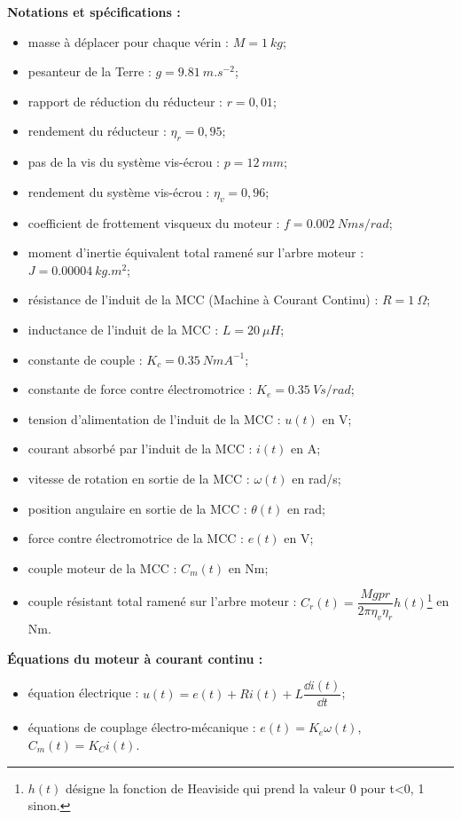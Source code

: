 \textbf{Notations et spécifications :}
\begin{multicols}{2}
\begin{itemize}
\item masse à déplacer pour chaque vérin : $M =\SI{1}{kg}$;
\item pesanteur de la Terre : $g = \SI{9,81}{m.s^{-2}}$;
\item rapport de réduction du réducteur : $r = 0,01$;
\item rendement du réducteur : $\eta_r = 0,95$;
\item pas de la vis du système vis-écrou : $p = \SI{12}{mm}$;
\item rendement du système vis-écrou : $\eta_v = 0,96$;
\item coefficient de frottement visqueux du moteur : $f=\SI{0,002}{Nms/rad}$;
\item moment d’inertie équivalent total ramené sur l’arbre moteur : $J = \SI{0,00004}{kg.m^2}$;
\item résistance de l’induit de la MCC (Machine à Courant Continu) : $R =\SI{1}{\Omega}$;
\item inductance de l’induit de la MCC : $L = \SI{20}{\mu H}$;
\item constante de couple : $K_c = \SI{0,35}{NmA^{-1}}$;
\item constante de force contre électromotrice : $K_e = \SI{0,35}{Vs/rad}$;
\item tension d’alimentation de l’induit de la MCC : $u(t)$ en \si{V};
\item courant absorbé par l’induit de la MCC : $i(t)$ en \si{A};
\item vitesse de rotation en sortie de la MCC : $\omega(t)$ en \si{rad/s};
\item position angulaire en sortie de la MCC :  $\theta(t)$ en \si{rad};
\item force contre électromotrice de la MCC : $e(t)$ en \si{V};
\item couple moteur de la MCC : $C_m(t)$ en \si{Nm};
\item couple résistant total ramené sur l’arbre moteur : $C_r(t) = \dfrac{Mgpr}{2\pi \eta_v \eta_r} h(t)$\footnote{$h(t)$ désigne la fonction de Heaviside qui prend la valeur 0 pour t<0, 1 sinon.} en \si{Nm}.
\end{itemize}
\end{multicols}

\textbf{Équations du moteur à courant continu :}
\begin{multicols}{2}
\begin{itemize}
\item équation électrique : $u(t)=e(t)+Ri(t)+L\dfrac{\dd i(t)}{\dd t}$;
\item équations de couplage électro-mécanique : $e(t)=K_e \omega(t)$, $C_m(t)=K_C i(t)$.
\end{itemize}
\end{multicols}



